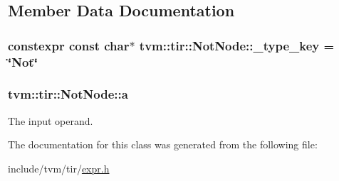 \subsection{Member Data Documentation}
\subsubsection[{\texorpdfstring{\+\_\+type\+\_\+key}{_type_key}}]{\setlength{\rightskip}{0pt plus 5cm}constexpr const char$\ast$ tvm\+::tir\+::\+Not\+Node\+::\+\_\+type\+\_\+key = \char`\"{}Not\char`\"{}\hspace{0.3cm}{\ttfamily [static]}}\hypertarget{classtvm_1_1tir_1_1NotNode_a68713847b797749b76d716cecebb0faf}{}\label{classtvm_1_1tir_1_1NotNode_a68713847b797749b76d716cecebb0faf}
\subsubsection[{\texorpdfstring{a}{a}}]{ tvm\+::tir\+::\+Not\+Node\+::a}\hypertarget{classtvm_1_1tir_1_1NotNode_a2216c35efead7567a99c13750df5cd6e}{}\label{classtvm_1_1tir_1_1NotNode_a2216c35efead7567a99c13750df5cd6e}


The input operand. 



The documentation for this class was generated from the following file\+:\begin{DoxyCompactItemize}
\item 
include/tvm/tir/\hyperlink{tir_2expr_8h}{expr.\+h}\end{DoxyCompactItemize}
